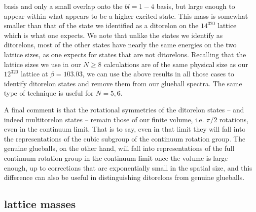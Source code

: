 \documentclass[12pt]{article}
\begin{document}
basis and only a small overlap onto the $bl=1-4$ basis, but large enough to appear within
what appears to be a higher excited state. This mass is somewhat smaller than that of the
state we identified as a ditorelon on the  $14^320$ lattice which is what one expects.
We note that unlike the states we identify as ditorelons, most of the other states
have nearly the same energies on the two lattice sizes, as one expects for states that
are not ditorelons. Recalling that the lattice sizes we use in our $N\geq 8$ calculations
are of the same physical size as our $12^320$ lattice at  $\beta=103.03$, we can use
the above results in all those cases to identify ditorelon states and remove them from
our glueball spectra. The same type of technique is useful for $N=5,6$.

A final comment is that the rotational symmetries of the ditorelon states
-- and indeed multitorelon states -- remain those of our finite volume, i.e. $\pi/2$ rotations,
even in the continuum limit. That is to say, even in that limit
they will fall into the representations of the cubic subgroup of the continuum rotation group.
The genuine glueballs, on the other hand, will fall into representations of the full continuum
rotation group in the continuum limit once the volume is large enough, up to corrections
that are exponentially small in the spatial size, and this difference can also be useful
in distinguishing ditorelons from genuine glueballs.


%
%
\subsection{lattice masses}
\label{subsection_latticemass} 
\end{document}
